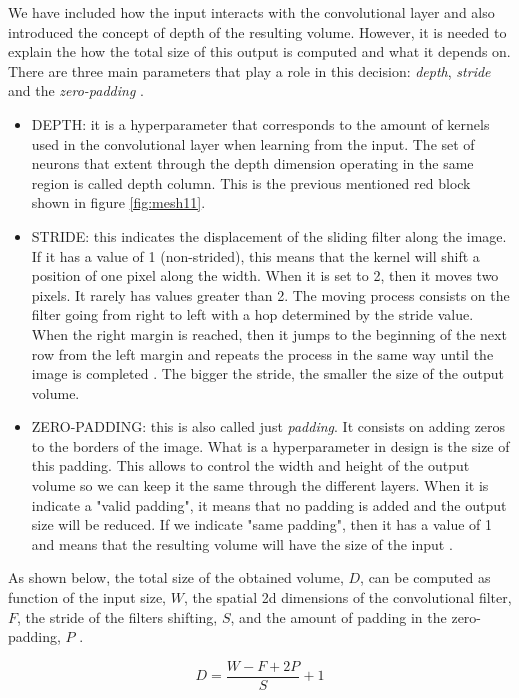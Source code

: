 	We have included how the input interacts with the convolutional layer and also introduced the concept of depth of the resulting volume. However, it is needed to explain the how the total size of this output is computed and what it depends on. There are three main parameters that play a role in this decision: \textit{depth}, \textit{stride} and the \textit{zero-padding} \cite{Karpathy2016}.
	
	\begin{itemize}
		\item DEPTH: it is a hyperparameter that corresponds to the amount of kernels used in the convolutional layer when learning from the input.  The set of neurons that extent through the depth dimension operating in the same region is called depth column. This is the previous mentioned red block shown in figure \ref{fig:mesh11}.
		\item STRIDE: this indicates the displacement of the sliding filter along the image. If it has a value of 1 (non-strided), this means that the kernel will shift a position of one pixel along the width. When it is set to 2, then it moves two pixels. It rarely has values greater than 2. The moving process consists on the filter going from right to left with a hop determined by the stride value. When the right margin is reached, then it jumps to the beginning of the next row from the left margin and repeats the process in the same way until the image is completed \cite{Saha2018}. The bigger the stride, the smaller the size of the output volume.
		\item ZERO-PADDING: this is also called just \textit{padding}. It consists on adding zeros to the borders of the image. What is a hyperparameter in design is the size of this padding. This allows to control the width and height of the output volume so we can keep it the same through the different layers. When it is indicate a "valid padding", it means that no padding is added and the output size will be reduced. If we indicate "same padding", then it has a value of 1 and means that the resulting volume will have the size of the input \cite{Keras}.
	\end{itemize}

	As shown below, the total size of the obtained volume, $D$, can be computed as function of the input size, $W$, the spatial 2\acrshort{d} dimensions of the convolutional filter, $F$, the stride of the filters shifting, $S$,  and the amount of padding in the zero-padding, $P$ \cite{Karpathy2016}. 
	
	\[ D = \frac{W - F + 2P}{S} + 1 \]
	
